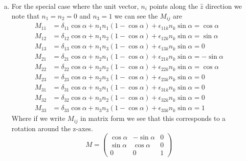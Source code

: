 \documentclass[11pt]{article}
\numberwithin{equation}{section}
\begin{document}
\begin{enumerate}[(a)]
\item
    For the special case where the unit vector, $n_i$ points along the $\hat{z}$ direction we note that $n_1=n_2=0$ 
    and $n_3=1$ we  can see the $M_{ij}$ are
    \begin{align*}
        M_{11} &= \delta_{11}\cos\alpha + n_{1}n_{1}(1-\cos\alpha) + \epsilon_{11k}n_k\sin\alpha = \cos\alpha \\
        M_{12} &= \delta_{12}\cos\alpha + n_{1}n_{2}(1-\cos\alpha) + \epsilon_{12k}n_k\sin\alpha = \sin\alpha \\
        M_{13} &= \delta_{13}\cos\alpha + n_{1}n_{3}(1-\cos\alpha) + \epsilon_{13k}n_k\sin\alpha = 0 \\
        M_{21} &= \delta_{21}\cos\alpha + n_{2}n_{1}(1-\cos\alpha) + \epsilon_{21k}n_k\sin\alpha = -\sin\alpha \\
        M_{22} &= \delta_{22}\cos\alpha + n_{2}n_{2}(1-\cos\alpha) + \epsilon_{22k}n_k\sin\alpha = \cos\alpha \\
        M_{23} &= \delta_{23}\cos\alpha + n_{2}n_{3}(1-\cos\alpha) + \epsilon_{23k}n_k\sin\alpha = 0 \\
        M_{31} &= \delta_{31}\cos\alpha + n_{3}n_{1}(1-\cos\alpha) + \epsilon_{31k}n_k\sin\alpha = 0 \\
        M_{32} &= \delta_{32}\cos\alpha + n_{3}n_{2}(1-\cos\alpha) + \epsilon_{32k}n_k\sin\alpha = 0 \\
        M_{33} &= \delta_{33}\cos\alpha + n_{3}n_{3}(1-\cos\alpha) + \epsilon_{33k}n_k\sin\alpha = 1 
    \end{align*}
    Where if we write $M_{ij}$ in matrix form we see that this corresponds to a rotation around the z-axes.
    $$M = \left(\begin{array}{ccc}
            \cos\alpha  &-\sin\alpha    &0\\
            \sin\alpha  &\cos\alpha     &0\\
            0           &0              &1
    \end{array}\right)$$
\end{enumerate}

\pagebreak
\end{document}

